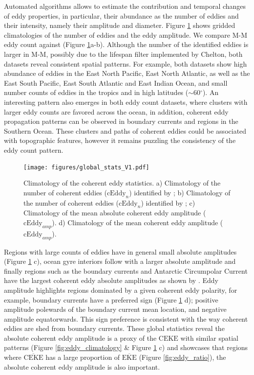 \documentclass[draft,linenumbers]{agujournal2019}
\newcommand{\MEKE}{\overline{\textrm{EKE}}}
\newcommand{\MCEKE}{\overline{\textrm{CEKE}}}
\newcommand{\CEKE}{\textrm{CEKE}}
\newcommand{\cEddy}{\textrm{cEddy}}
\begin{document}
	Automated algorithms allows to estimate the contribution and temporal changes of eddy properties, in particular, their abundance as the number of eddies and their intensity, namely their amplitude and diameter. 
	Figure \ref{fig:eddy_stats_climatology} shows gridded climatologies of the number of eddies and the eddy amplitude. 
	We compare M-M eddy count against \citet{Chelton_Global_2007} (Figure \ref{fig:eddy_stats_climatology}a-b). Although the number of the identified eddies is larger in M-M, possibly due to the lifespan filter implemented by Chelton, both datasets reveal consistent spatial patterns. 
	For example, both datasets show high abundance of eddies in the East North Pacific, East North Atlantic, as well as the East South Pacific, East South Atlantic and East Indian Ocean, and small number counts of eddies in the tropics and in high latitudes ($\sim$60$^\circ$). 
	An interesting pattern also emerges in both eddy count datasets, where clusters with larger eddy counts are favored across the ocean, in addition, coherent eddy propagation patterns can be observed in boundary currents and regions in the Southern Ocean. 
	These clusters and paths of coherent eddies could be associated with topographic features, however it remains puzzling the consistency of the eddy count pattern.
	
	\begin{figure}
	    \centering
	    \texttt{[image: figures/global\_stats\_V1.pdf]}
	    \caption{Climatology of the coherent eddy statistics. a) Climatology of the number of coherent eddies ($\cEddy_n$) identified by \citet{Chelton_Global_2007};  b) Climatology of the number of coherent eddies ($\cEddy_n$) identified by \citet{Martinez_TKE_2019}; c) Climatology of the mean absolute coherent eddy amplitude ($\cEddy_{amp}$). d) Climatology of the mean coherent eddy amplitude ($\cEddy_{amp}$).}
	    \label{fig:eddy_stats_climatology}
	\end{figure}
	
	Regions with large counts of eddies have in general small absolute amplitudes (Figure \ref{fig:eddy_stats_climatology} c), ocean gyre interiors follow with a larger absolute amplitude and finally regions such as the boundary currents and Antarctic Circumpolar Current have the largest coherent eddy absolute amplitudes as shown by \citet{Chelton_The_2011}.
	Eddy amplitude highlights regions dominated by a given coherent eddy polarity, for example, boundary currents have a preferred sign (Figure \ref{fig:eddy_stats_climatology} d); positive amplitude polewards of the boundary current mean location, and negative amplitude equatorwards. 
	This sign preference is consistent with the way coherent eddies are shed from boundary currents. 
	These global statistics reveal the absolute coherent eddy amplitude is a proxy of the $\CEKE$ with similar spatial patterns (Figure \ref{fig:eddy_climatology} \& Figure \ref{fig:eddy_stats_climatology} c) and showcases that regions where $\MCEKE$ has a large proportion of $\MEKE$ (Figure \ref{fig:eddy_ratio}), the absolute coherent eddy amplitude is also important.
\end{document}
